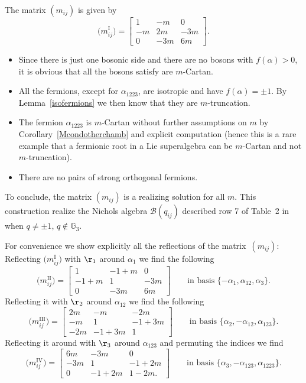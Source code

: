 \documentclass[10pt,a4paper]{amsart}
\numberwithin{equation}{section}
\begin{document}
The matrix $(m_{ij})$ is given by
\[
\big(m_{ij}^\mathrm{I}\big)= \begin{bmatrix}
1 & -m & 0\\
 -m & 2m & -3m\\
0 & -3m & 6m
\end{bmatrix}.
\]
\begin{itemize}\itemsep=0pt
	\item Since there is just one bosonic side and there are no bosons with $f(\alpha)>0$, it is obvious that all the bosons satisfy are $m$-Cartan.
	\item All the fermions, except for $\alpha_{1223}$, are isotropic and have $f(\alpha)= \pm 1$. By Lemma~\ref{isofermions} we then know that they are $m$-truncation.
	\item The fermion $\alpha_{1223}$ is $m$-Cartan without further assumptions on $m$ by Corollary~\ref{Mcondotherchamb} and explicit computation
	(hence this is a rare example that a fermionic root in a Lie superalgebra can be $m$-Cartan and not $m$-truncation).
	\item There are no pairs of strong orthogonal fermions.
\end{itemize}
To conclude, the matrix $(m_{ij})$ is a realizing solution for all $m$.
This construction realize the Nichols algebra $\mathcal{B}(q_{ij})$ described row 7 of Table~2 in~\cite{Hecklist} when $q\neq \pm 1$, $q\not\in\mathbb{G}_3$.

For convenience we show explicitly all the reflections of the matrix~$(m_{ij})$:
Reflecting $\big(m_{ij}^\mathrm{I}\big)$ with $\r_1$ around $\alpha_1$ we find the following
\[
\big(m_{ij}^\mathrm{II}\big)= \begin{bmatrix}
 1 & -1+m & 0\\
 -1+m &  1 & -3m \\
 0 & -3m & 6m
\end{bmatrix}
\qquad \text{in basis } \{-\alpha_1,\alpha_{12},\alpha_3\}.
\]
Reflecting it with $\r_2$ around $\alpha_{12}$ we find the following
\[
\big(m_{ij}^\mathrm{III}\big)= \begin{bmatrix}
 2m & -m & -2m\\
 -m &  1 & -1+3m \\
 -2m & -1+3m & 1
\end{bmatrix}\qquad
\text{in basis } \{\alpha_2,-\alpha_{12},\alpha_{123}\}.
\]
Reflecting it around with $\r_3$ around $\alpha_{123}$ and permuting the indices we find
\[
\big(m_{ij}^\mathrm{IV}\big)= \begin{bmatrix}
6m & -3m & 0\\
-3m &  1 & -1+2m \\
0 & -1+2m & 1-2m.
\end{bmatrix}\qquad
\text{in basis } \{\alpha_{3},-\alpha_{123},\alpha_{1223}\}.
\]
\end{document}
